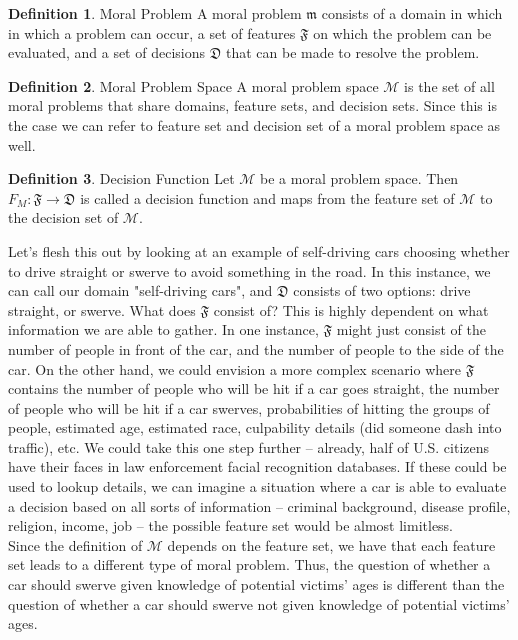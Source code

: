\documentclass[11pt]{article}
\theoremstyle{definition}
\newtheorem{definition}{Definition}[section]
\newcommand{\F}{\mathfrak{F}}
\newcommand{\D}{\mathfrak{D}}
\newcommand{\M}{\mathcal{M}}
\begin{document}
\theoremstyle{definition}
\begin{definition}{Moral Problem}
A moral problem $\mathfrak{m}$ consists of a domain in which in which a problem can occur, a set of features $\mathfrak{F}$ on which the problem can be evaluated, and a set of decisions $\mathfrak{D}$ that can be made to resolve the problem.
\end{definition}

\theoremstyle{definition}
\begin{definition}{Moral Problem Space}
A moral problem space $\mathcal
{M}$ is the set of all moral problems that share domains, feature sets, and decision sets. Since this is the case we can refer to feature set and decision set of a moral problem space as well.
\end{definition}

\theoremstyle{definition}
\begin{definition}{Decision Function}
Let $\M$ be a moral problem space. Then $F_M: \F \rightarrow \D$ is called a decision function and maps from the feature set of $\M$ to the decision set of $\M$.
\end{definition}

Let's flesh this out by looking at an example of self-driving cars choosing whether to drive straight or swerve to avoid something in the road. In this instance, we can call our domain "self-driving cars", and $\D$ consists of two options: drive straight, or swerve. What does $\F$ consist of? This is highly dependent on what information we are able to gather. In one instance, $\F$ might just consist of the number of people in front of the car, and the number of people to the side of the car. On the other hand, we could envision a more complex scenario where $\F$ contains the number of people who will be hit if a car goes straight, the number of people who will be hit if a car swerves, probabilities of hitting the groups of people, estimated age, estimated race, culpability details (did someone dash into traffic), etc. We could take this one step further -- already, half of U.S. citizens have their faces in law enforcement facial recognition databases. If these could be used to lookup details, we can imagine a situation where a car is able to evaluate a decision based on all sorts of information -- criminal background, disease profile, religion, income, job -- the possible feature set would be almost limitless. \\

Since the definition of $\M$ depends on the feature set, we have that each feature set leads to a different type of moral problem. Thus, the question of whether a car should swerve given knowledge of potential victims' ages is different than the question of whether a car should swerve not given knowledge of potential victims' ages.\\
\end{document}
